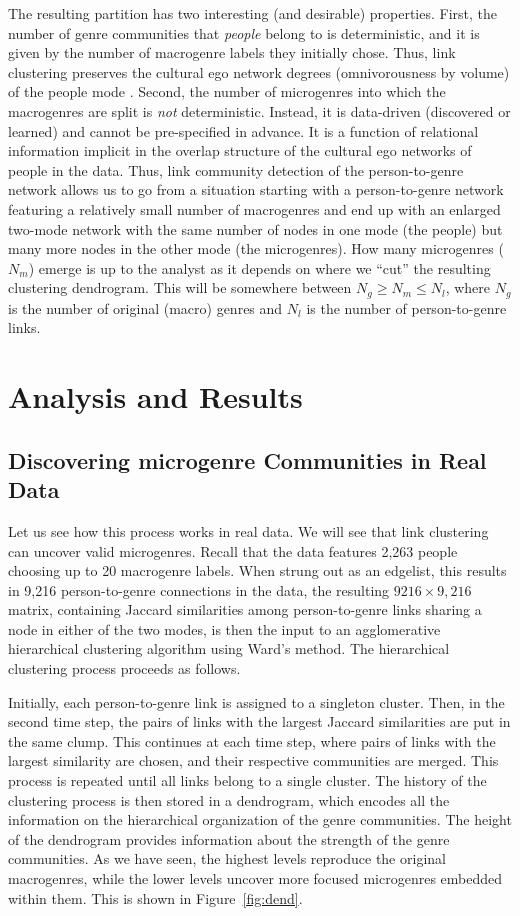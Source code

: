 \documentclass[a4paper,12pt]{extarticle}
\begin{document}
The resulting partition has two interesting (and desirable) properties. First, the number of genre communities that \textit{people} belong to is deterministic, and it is given by the number of macrogenre labels they initially chose. Thus, link clustering preserves the cultural ego network degrees (omnivorousness by volume) of the people mode \citep{lizardo14}. Second, the number of microgenres into which the macrogenres are split is {\em not} deterministic. Instead, it is data-driven (discovered or learned) and cannot be pre-specified in advance. It is a function of relational information implicit in the overlap structure of the cultural ego networks of people in the data. Thus, link community detection of the person-to-genre network allows us to go from a situation starting with a person-to-genre network featuring a relatively small number of macrogenres and end up with an enlarged two-mode network with the same number of nodes in one mode (the people) but many more nodes in the other mode (the microgenres). How many microgenres ($N_m$) emerge is up to the analyst as it depends on where we ``cut'' the resulting clustering dendrogram. This will be somewhere between $N_g \geq N_m \leq N_l$, where $N_g$ is the number of original (macro) genres and $N_l$ is the number of person-to-genre links.

\section{Analysis and Results}
\subsection{Discovering microgenre Communities in Real Data}
Let us see how this process works in real data. We will see that link clustering can uncover valid microgenres. Recall that the data features 2,263 people choosing up to 20 macrogenre labels. When strung out as an edgelist, this results in 9,216 person-to-genre connections in the data, the resulting $9216 \times 9,216$ matrix, containing Jaccard similarities among person-to-genre links sharing a node in either of the two modes, is then the input to an agglomerative hierarchical clustering algorithm using Ward's \citep{ward63} method. The hierarchical clustering process proceeds as follows. 

Initially, each person-to-genre link is assigned to a singleton cluster. Then, in the second time step, the pairs of links with the largest Jaccard similarities are put in the same clump. This continues at each time step, where pairs of links with the largest similarity are chosen, and their respective communities are merged. This process is repeated until all links belong to a single cluster. The history of the clustering process is then stored in a dendrogram, which encodes all the information on the hierarchical organization of the genre communities. The height of the dendrogram provides information about the strength of the genre communities. As we have seen, the highest levels reproduce the original macrogenres, while the lower levels uncover more focused microgenres embedded within them. This is shown in Figure~\ref{fig:dend}. 
\end{document}
